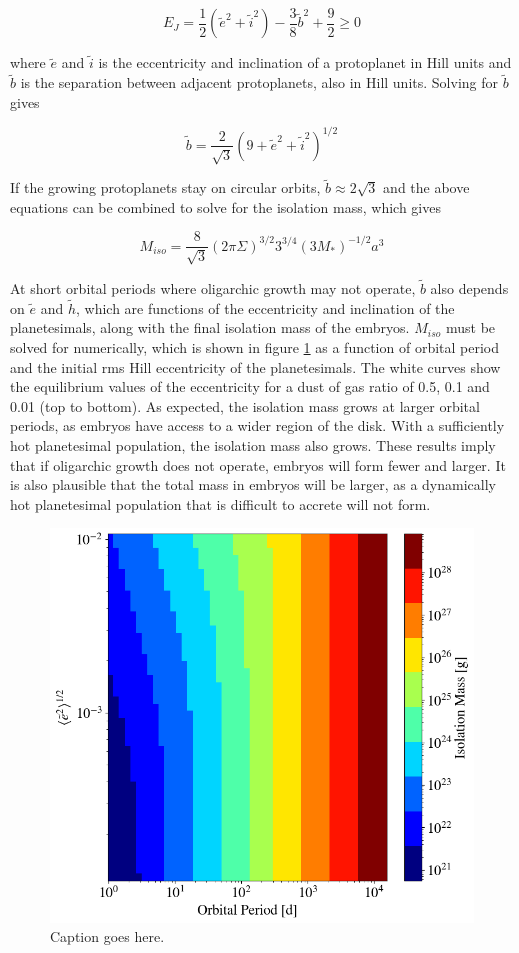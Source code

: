 \documentclass[onecolumn]{aastex63}
\begin{document}
\begin{equation}
    E_{J} = \frac{1}{2} \left( \tilde{e}^{2} + \tilde{i}^{2} \right) - \frac{3}{8} \tilde{b}^{2} + \frac{9}{2}  \geq 0
\end{equation}

\noindent where $\tilde{e}$ and  $\tilde{i}$ is the eccentricity and inclination of a protoplanet in Hill units and $\tilde{b}$ is the separation between adjacent protoplanets, also in Hill units. Solving for $\tilde{b}$ gives

\begin{equation}
    \tilde{b} = \frac{2}{\sqrt{3}} \left( 9 + \tilde{e}^{2} + \tilde{i}^{2} \right)^{1/2}
\end{equation}

If the growing protoplanets stay on circular orbits, $\tilde{b} \approx 2 \sqrt{3}$ and the above equations can be combined to solve for the isolation mass, which gives

\begin{equation}
    M_{iso} = \frac{8}{\sqrt{3}} \left(2 \pi \Sigma \right)^{3/2} 3^{3/4} \left( 3 M_{*} \right)^{-1/2} a^{3}
\end{equation}

At short orbital periods where oligarchic growth may not operate, $\tilde{b}$ also depends on $\tilde{e}$ and $\tilde{h}$, which are functions of the eccentricity and inclination of the planetesimals, along with the final isolation mass of the embryos. $M_{iso}$ must be solved for numerically, which is shown in figure \ref{fig:m_iso} as a function of orbital period and the initial rms Hill eccentricity of the planetesimals. The white curves show the equilibrium values of the eccentricity for a dust of gas ratio of 0.5, 0.1 and 0.01 (top to bottom). As expected, the isolation mass grows at larger orbital periods, as embryos have access to a wider region of the disk. With a sufficiently hot planetesimal population, the isolation mass also grows. These results imply that if oligarchic growth does not operate, embryos will form fewer and larger. It is also plausible that the total mass in embryos will be larger, as a dynamically hot planetesimal population that is difficult to accrete will not form.

\begin{figure}
    \begin{center}
    \includegraphics[width=0.4\columnwidth]{figures/m_iso.png}
    \caption{Caption goes here.\label{fig:m_iso}}
    \end{center}
\end{figure}
\end{document}
